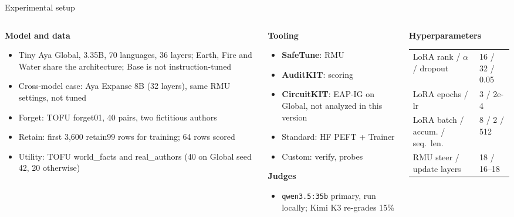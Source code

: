 \documentclass[aspectratio=169,11pt,usepdftitle=false]{beamer}
\newcommand{\code}[1]{\texttt{#1}}
\begin{document}
\begin{frame}{Experimental setup}
\scriptsize
\begin{columns}[T]
\begin{column}{0.31\textwidth}
\textbf{Model and data}
\begin{itemize}
\item Tiny Aya Global, 3.35B, 70 languages, 36 layers; Earth, Fire and Water share the architecture; Base is not instruction-tuned
\item Cross-model case: Aya Expanse 8B (32 layers), same RMU settings, not tuned
\item Forget: TOFU forget01, 40 pairs, two fictitious authors
\item Retain: first 3,600 retain99 rows for training; 64 rows scored
\item Utility: TOFU world\_facts and real\_authors (40 on Global seed 42, 20 otherwise)
\end{itemize}
\end{column}
\begin{column}{0.27\textwidth}
\textbf{Tooling}
\begin{itemize}
\item {\color{safecol}\textbf{SafeTune}}: RMU
\item {\color{auditcol}\textbf{AuditKIT}}: scoring
\item {\color{circcol}\textbf{CircuitKIT}}: EAP-IG on Global, not analyzed in this version
\item Standard: HF PEFT + Trainer
\item Custom: verify, probes
\end{itemize}
\textbf{Judges}
\begin{itemize}
\item \code{qwen3.5:35b} primary, run locally; Kimi K3 re-grades 15\%
\end{itemize}
\end{column}
\begin{column}{0.38\textwidth}
\textbf{Hyperparameters}\\[2pt]
\tiny
\setlength{\tabcolsep}{2pt}
\begin{tabular}{@{}ll@{}}
\toprule
LoRA rank / $\alpha$ / dropout & 16 / 32 / 0.05 \\
LoRA epochs / lr & 3 / 2e-4 \\
LoRA batch / accum. / seq.\ len. & 8 / 2 / 512 \\
RMU steer / update layers & 18 / 16--18 \\

\end{tabular}
\end{column}
\end{columns}
\end{frame}
\end{document}
